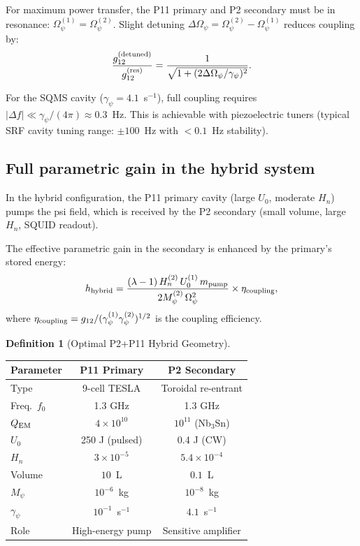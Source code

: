 \documentclass[11pt,twocolumn]{article}
\newcommand{\lam}{\lambda}
\newcommand{\Opsi}{\Omega_\psi}
\newcommand{\gpsi}{\gamma_\psi}
\newcommand{\Mpsi}{M_\psi}
\newcommand{\ee}[1]{\times 10^{#1}}
\theoremstyle{definition}
\newtheorem{definition}[theorem]{Definition}
\theoremstyle{remark}
\begin{document}
For maximum power transfer, the P11 primary and P2 secondary must be
in resonance: $\Opsi^{(1)} = \Opsi^{(2)}$.
Slight detuning $\Delta\Opsi = \Opsi^{(2)} - \Opsi^{(1)}$ reduces coupling by:
\begin{equation}
\frac{g_{12}^{(\rm detuned)}}{g_{12}^{(\rm res)}}
= \frac{1}{\sqrt{1 + (2\Delta\Opsi/\gpsi)^2}}.
\label{eq:detuning_factor}
\end{equation}

For the SQMS cavity ($\gpsi = 4.1$~s$^{-1}$), full coupling requires
$|\Delta f| \ll \gpsi/(4\pi) \approx 0.3$~Hz.
This is achievable with piezoelectric tuners (typical SRF cavity tuning
range: $\pm 100$~Hz with $< 0.1$~Hz stability).

\subsection{Full parametric gain in the hybrid system}
\label{sec:hybrid_gain}

In the hybrid configuration, the P11 primary cavity (large $U_0$,
moderate $H_n$) pumps the psi field, which is received by the P2
secondary (small volume, large $H_n$, SQUID readout).

The effective parametric gain in the secondary is enhanced by the
primary's stored energy:
\begin{equation}
h_{\rm hybrid} = \frac{(\lam-1)\,H_n^{(2)}\,U_0^{(1)}\,m_{\rm pump}}
{2\Mpsi^{(2)}\,\Opsi^2}\times\eta_{\rm coupling},
\label{eq:h_hybrid}
\end{equation}
where $\eta_{\rm coupling} = g_{12}/(\gpsi^{(1)}\gpsi^{(2)})^{1/2}$
is the coupling efficiency.

\begin{definition}[Optimal P2+P11 Hybrid Geometry]
\label{def:hybrid}
\begin{center}
\begin{tabular}{lcc}
\toprule
Parameter & P11 Primary & P2 Secondary \\
\midrule
Type & 9-cell TESLA & Toroidal re-entrant \\
Freq.\ $f_0$ & 1.3 GHz & 1.3 GHz \\
$Q_{\rm EM}$ & $4\ee{10}$ & $10^{11}$ (Nb$_3$Sn) \\
$U_0$ & 250 J (pulsed) & 0.4 J (CW) \\
$H_n$ & $3\ee{-5}$ & $5.4\ee{-4}$ \\
Volume & $10$~L & $0.1$~L \\
$\Mpsi$ & $10^{-6}$~kg & $10^{-8}$~kg \\
$\gpsi$ & $10^{-1}$~s$^{-1}$ & $4.1$~s$^{-1}$ \\
Role & High-energy pump & Sensitive amplifier \\
\bottomrule
\end{tabular}
\end{center}
\end{definition}
\end{document}

